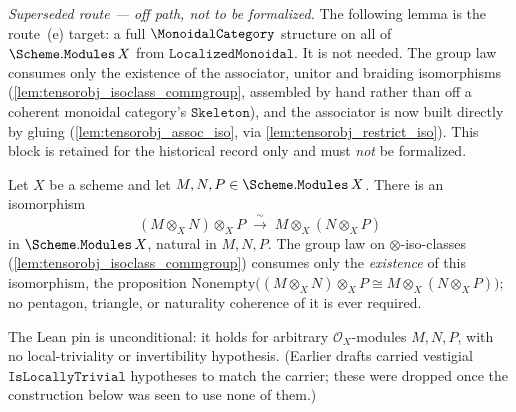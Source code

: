 \emph{Superseded route --- off path, not to be formalized.} The following lemma is
the route~(e) target: a full \(\MonoidalCategory\) structure on all of
\(\Scheme.\mathtt{Modules}\,X\) from \(\mathtt{LocalizedMonoidal}\). It is not
needed. The group law consumes only the existence of the associator, unitor and
braiding isomorphisms (\cref{lem:tensorobj_isoclass_commgroup}, assembled by hand
rather than off a coherent monoidal category's \(\mathtt{Skeleton}\)), and the
associator is now built directly by
gluing (\cref{lem:tensorobj_assoc_iso}, via \cref{lem:tensorobj_restrict_iso}). This
block is retained for the historical record only and must \emph{not} be formalized.

\begin{lemma}\leanok
  \label{lem:tensorobj_assoc_iso}
  Let \(X\) be a scheme and let
  \(M, N, P \in \Scheme.\mathtt{Modules}\,X\). There is an isomorphism
  \[
    (M \otimes_X N) \otimes_X P
      \;\xrightarrow{\ \sim\ }\;
    M \otimes_X (N \otimes_X P)
  \]
  in \(\Scheme.\mathtt{Modules}\,X\), natural in \(M, N, P\). The group law on
  \(\otimes\)-iso-classes (\cref{lem:tensorobj_isoclass_commgroup}) consumes only
  the \emph{existence} of this isomorphism, the proposition
  \(\mathrm{Nonempty}\bigl((M \otimes_X N) \otimes_X P \cong M \otimes_X (N
  \otimes_X P)\bigr)\); no pentagon, triangle, or naturality coherence of it is
  ever required.

  The Lean pin is unconditional: it holds for arbitrary
  \(\mathcal{O}_X\)-modules \(M, N, P\), with no local-triviality or
  invertibility hypothesis. (Earlier drafts carried vestigial
  \(\mathtt{IsLocallyTrivial}\) hypotheses to match the carrier; these were
  dropped once the construction below was seen to use none of them.)
\end{lemma}

